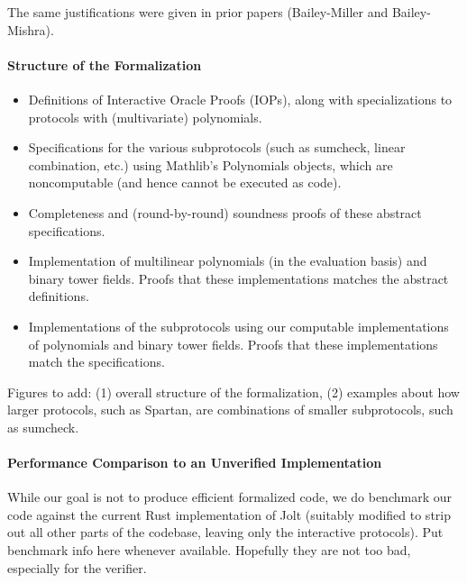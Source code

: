 The same justifications were given in prior papers (Bailey-Miller and Bailey-Mishra).







\paragraph{Structure of the Formalization}

\begin{itemize}
    \item Definitions of Interactive Oracle Proofs (IOPs), along with specializations to protocols with (multivariate) polynomials.
    \item Specifications for the various subprotocols (such as sumcheck, linear combination, etc.) using Mathlib's Polynomials objects, which are noncomputable (and hence cannot be executed as code).
    \item Completeness and (round-by-round) soundness proofs of these abstract specifications.
    \item Implementation of multilinear polynomials (in the evaluation basis) and binary tower fields. Proofs that these implementations matches the abstract definitions.
    \item Implementations of the subprotocols using our computable implementations of polynomials and binary tower fields. Proofs that these implementations match the specifications.
\end{itemize}

{\color{red} Figures to add: (1) overall structure of the formalization, (2) examples about how larger protocols, such as Spartan, are combinations of smaller subprotocols, such as sumcheck.}



\paragraph{Performance Comparison to an Unverified Implementation} While our goal is not to produce efficient formalized code, we do benchmark our code against the current Rust implementation of Jolt (suitably modified to strip out all other parts of the codebase, leaving only the interactive protocols). {\color{red} Put benchmark info here whenever available. Hopefully they are not too bad, especially for the verifier.}

